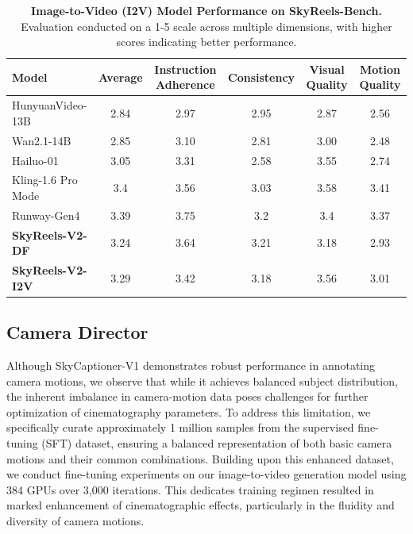 \documentclass{article}
\begin{document}
\begin{table}[htbp]
\centering
\setlength{\tabcolsep}{0pt}
\begin{tabular*}{\textwidth}{@{\extracolsep{\fill}}lccccc@{}}
\toprule
\textbf{Model} & \textbf{Average} & \textbf{Instruction Adherence} & \textbf{Consistency} & \textbf{Visual Quality} & \textbf{Motion Quality} \\
\midrule
HunyuanVideo-13B \cite{kong2024hunyuanvideo} & 2.84 & 2.97 & 2.95 & 2.87 & 2.56 \\
Wan2.1-14B \cite{wan2025} & 2.85 & 3.10 & 2.81 & 3.00 & 2.48 \\
Hailuo-01 \cite{minimax2024hailuo} & 3.05 & 3.31 & 2.58 & 3.55 & 2.74 \\
Kling-1.6 Pro Mode \cite{kuaishou2024kling}& 3.4 & 3.56 & 3.03 & 3.58 & 3.41 \\
Runway-Gen4 \cite{runwayml2024gen4} & 3.39 & 3.75 & 3.2 & 3.4 & 3.37 \\
\textbf{SkyReels-V2-DF} & 3.24 & 3.64 & 3.21 & 3.18 & 2.93 \\
\textbf{SkyReels-V2-I2V} & 3.29 & 3.42 & 3.18 & 3.56 & 3.01 \\
\bottomrule
\end{tabular*}
\vspace{4pt}
\caption{\textbf{Image-to-Video (I2V) Model Performance on SkyReels-Bench.} Evaluation conducted on a 1-5 scale across multiple dimensions, with higher scores indicating better performance.}
\label{tab:skyreels-bench-i2v}
\end{table}

\subsection{Camera Director}
Although SkyCaptioner-V1 demonstrates robust performance in annotating camera motions, we observe that while it achieves balanced subject distribution, the inherent imbalance in camera-motion data poses challenges for further optimization of cinematography parameters. To address this limitation, we specifically curate approximately 1 million samples from the supervised fine-tuning (SFT) dataset, ensuring a balanced representation of both basic camera motions and their common combinations. Building upon this enhanced dataset, we conduct fine-tuning experiments on our image-to-video generation model using 384 GPUs over 3,000 iterations. This dedicates training regimen resulted in marked enhancement of cinematographic effects, particularly in the fluidity and diversity of camera motions.
\end{document}
